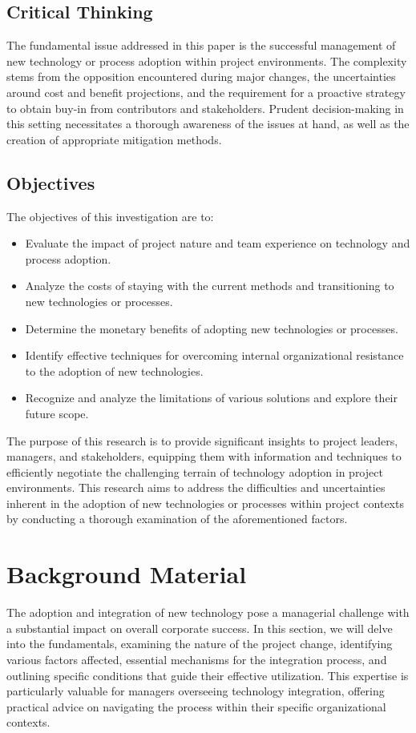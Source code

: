 \documentclass{article}
\begin{document}
\subsection{Critical Thinking}
The fundamental issue addressed in this paper is the successful management of new technology or process adoption within project environments. The complexity stems from the opposition encountered during major changes, the uncertainties around cost and benefit projections, and the requirement for a proactive strategy to obtain buy-in from contributors and stakeholders. Prudent decision-making in this setting necessitates a thorough awareness of the issues at hand, as well as the creation of appropriate mitigation methods.

\subsection{Objectives}

The objectives of this investigation are to:

\begin{itemize}
  \item Evaluate the impact of project nature and team experience on technology and process adoption.
  \item Analyze the costs of staying with the current methods and transitioning to new technologies or processes.
  \item Determine the monetary benefits of adopting new technologies or processes.
  \item Identify effective techniques for overcoming internal organizational resistance to the adoption of new technologies.
  \item Recognize and analyze the limitations of various solutions and explore their future scope.
\end{itemize}

\noindent The purpose of this research is to provide significant insights to project leaders, managers, and stakeholders, equipping them with information and techniques to efficiently negotiate the challenging terrain of technology adoption in project environments. This research aims to address the difficulties and uncertainties inherent in the adoption of new technologies or processes within project contexts by conducting a thorough examination of the aforementioned factors.

\section{Background Material}
The adoption and integration of new technology pose a managerial challenge with a substantial impact on overall corporate success. In this section, we will delve into the fundamentals, examining the nature of the project change, identifying various factors affected, essential mechanisms for the integration process, and outlining specific conditions that guide their effective utilization. This expertise is particularly valuable for managers overseeing technology integration, offering practical advice on navigating the process within their specific organizational contexts.
\end{document}
